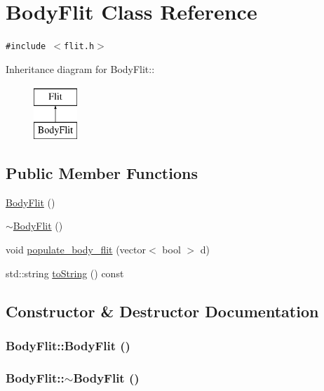 \hypertarget{classBodyFlit}{
\section{BodyFlit Class Reference}
\label{classBodyFlit}
}
{\tt \#include $<$flit.h$>$}

Inheritance diagram for BodyFlit::\begin{figure}[H]
\begin{center}
\leavevmode
\includegraphics[height=2cm]{classBodyFlit}
\end{center}
\end{figure}
\subsection*{Public Member Functions}
\begin{CompactItemize}
\item 
\hyperlink{classBodyFlit_794842b7823df2d936bb652a34778d9b}{BodyFlit} ()
\item 
\hyperlink{classBodyFlit_52d1abfb160afc4146c978bd7b20fdaa}{$\sim$BodyFlit} ()
\item 
void \hyperlink{classBodyFlit_52eb491a5ee62a1f8f9ffc71d955da94}{populate\_\-body\_\-flit} (vector$<$ bool $>$ d)
\item 
std::string \hyperlink{classBodyFlit_408f02aae1a229c761ff0f3537675cde}{toString} () const 
\end{CompactItemize}


\subsection{Constructor \& Destructor Documentation}
\hypertarget{classBodyFlit_794842b7823df2d936bb652a34778d9b}{
\subsubsection[{BodyFlit}]{\setlength{\rightskip}{0pt plus 5cm}BodyFlit::BodyFlit ()}}
\label{classBodyFlit_794842b7823df2d936bb652a34778d9b}


\hypertarget{classBodyFlit_52d1abfb160afc4146c978bd7b20fdaa}{
\subsubsection[{$\sim$BodyFlit}]{\setlength{\rightskip}{0pt plus 5cm}BodyFlit::$\sim$BodyFlit ()}}
\label{classBodyFlit_52d1abfb160afc4146c978bd7b20fdaa}




